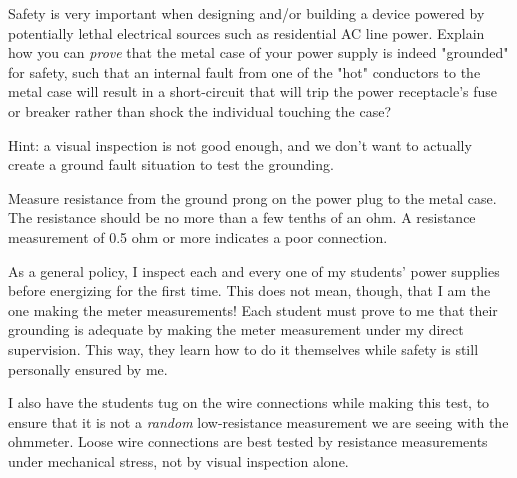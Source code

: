 

Safety is very important when designing and/or building a device powered by potentially lethal electrical sources such as residential AC line power.  Explain how you can {\it prove} that the metal case of your power supply is indeed "grounded" for safety, such that an internal fault from one of the "hot" conductors to the metal case will result in a short-circuit that will trip the power receptacle's fuse or breaker rather than shock the individual touching the case?  

Hint: a visual inspection is not good enough, and we don't want to actually create a ground fault situation to test the grounding.







Measure resistance from the ground prong on the power plug to the metal case.  The resistance should be no more than a few tenths of an ohm.  A resistance measurement of 0.5 ohm or more indicates a poor connection.







As a general policy, I inspect each and every one of my students' power supplies before energizing for the first time.  This does not mean, though, that I am the one making the meter measurements!  Each student must prove to me that their grounding is adequate by making the meter measurement under my direct supervision.  This way, they learn how to do it themselves while safety is still personally ensured by me.

I also have the students tug on the wire connections while making this test, to ensure that it is not a {\it random} low-resistance measurement we are seeing with the ohmmeter.  Loose wire connections are best tested by resistance measurements under mechanical stress, not by visual inspection alone.



